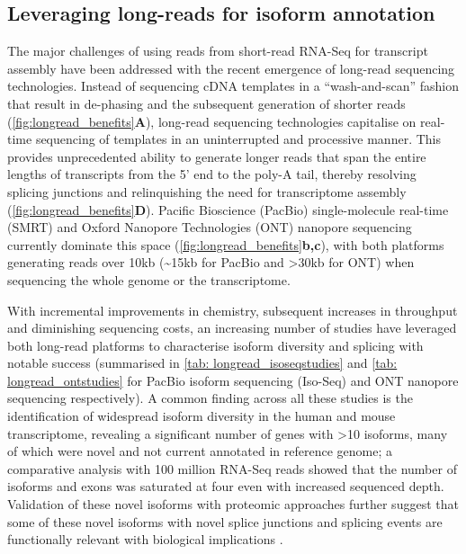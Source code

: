 \subsection{Leveraging long-reads for isoform annotation}
The major challenges of using reads from short-read RNA-Seq for transcript assembly have been addressed with the recent emergence of long-read sequencing technologies. Instead of sequencing cDNA templates in a “wash-and-scan” fashion that result in de-phasing and the subsequent generation of shorter reads (\cref{fig:longread_benefits}\textbf{A}), long-read sequencing technologies capitalise on real-time sequencing of templates in an uninterrupted and processive manner. This provides unprecedented ability to generate longer reads that span the entire lengths of transcripts from the 5' end to the poly-A tail, thereby resolving splicing junctions and relinquishing the need for transcriptome assembly (\cref{fig:longread_benefits}\textbf{D}). Pacific Bioscience (PacBio) single-molecule real-time (SMRT) and Oxford Nanopore Technologies (ONT) nanopore sequencing currently dominate this space (\cref{fig:longread_benefits}\textbf{b,c}), with both platforms generating reads over 10kb (\textasciitilde15kb for PacBio and >30kb for ONT) when sequencing the whole genome or the transcriptome.  

With incremental improvements in chemistry, subsequent increases in throughput and diminishing sequencing costs, an increasing number of studies have leveraged both long-read platforms to characterise isoform diversity and splicing with notable success (summarised in \cref{tab: longread_isoseqstudies} and \cref{tab: longread_ontstudies} for PacBio isoform sequencing (Iso-Seq) and ONT nanopore sequencing respectively). A common finding across all these studies is the identification of widespread isoform diversity in the human and mouse transcriptome\cite{Sharon2013, Au2013,Tseng2019,DeslattesMays2019}, revealing a significant number of genes with >10 isoforms, many of which were novel and not current annotated in reference genome; a comparative analysis with 100 million RNA-Seq reads showed that the number of isoforms and exons was saturated at four even with increased sequenced depth\cite{DeslattesMays2019}. Validation of these novel isoforms with proteomic approaches further suggest that some of these novel isoforms with novel splice junctions and splicing events are functionally relevant with biological implications \cite{Huang2021}. 

